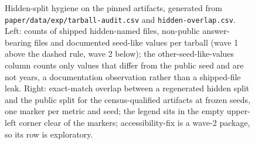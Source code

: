 \begin{figure}[!tbp]
\caption{Hidden-split hygiene on the \expAuditArtifacts{} pinned artifacts, generated from \texttt{paper/data/exp/}\allowbreak\texttt{tarball-audit.csv} and \texttt{hidden-overlap.csv}. Left: counts of shipped hidden-named files, non-public answer-bearing files and documented seed-like values per tarball (wave 1 above the dashed rule, wave 2 below); the other-seed-like-values column counts only values that differ from the public seed \suitePublicSeed{} and are not years, a documentation observation rather than a shipped-file leak. Right: exact-match overlap between a regenerated hidden split and the public split for the \expAuditCensusQualified{} census-qualified artifacts at \expAuditSeeds{} frozen seeds, one marker per metric and seed; the legend sits in the empty upper-left corner clear of the markers; accessibility-fix is a wave-2 package, so its row is exploratory.}
\label{fig:hiddenaudit}
\end{figure}
